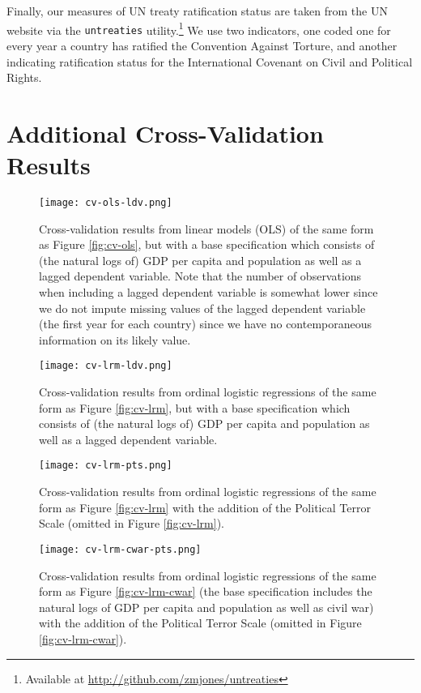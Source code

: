 \documentclass[11pt]{article}
\begin{document}
Finally, our measures of UN treaty ratification status are taken from the UN website via the {\tt untreaties} utility.\footnote{Available at \url{http://github.com/zmjones/untreaties}} We use two indicators, one coded one for every year a country has ratified the Convention Against Torture, and another indicating ratification status for the International Covenant on Civil and Political Rights. 

\section{Additional Cross-Validation Results}

\begin{figure}[!htpb]
\texttt{[image: cv-ols-ldv.png]}
\caption{Cross-validation results from linear models (OLS) of the same form as Figure \ref{fig:cv-ols}, but with a base specification which consists of (the natural logs of) GDP per capita and population as well as a lagged dependent variable. Note that the number of observations when including a lagged dependent variable is somewhat lower since we do not impute missing values of the lagged dependent variable (the first year for each country) since we have no contemporaneous information on its likely value.}
\label{fig:cv-ols-ldv}
\end{figure}

\begin{figure}[!htpb]
\texttt{[image: cv-lrm-ldv.png]}
\caption{Cross-validation results from ordinal logistic regressions of the same form as Figure \ref{fig:cv-lrm}, but with a base specification which consists of (the natural logs of) GDP per capita and population as well as a lagged dependent variable.}
\label{fig:cv-lrm-ldv}
\end{figure}

\begin{figure}[!htpb]
\texttt{[image: cv-lrm-pts.png]}
\caption{Cross-validation results from ordinal logistic regressions of the same form as Figure \ref{fig:cv-lrm} with the addition of the Political Terror Scale (omitted in Figure \ref{fig:cv-lrm}).}
\label{fig:cv-lrm-pts}
\end{figure}

\begin{figure}[!htpb]
\texttt{[image: cv-lrm-cwar-pts.png]}
\caption{Cross-validation results from ordinal logistic regressions of the same form as Figure \ref{fig:cv-lrm-cwar} (the base specification includes the natural logs of GDP per capita and population as well as civil war) with the addition of the Political Terror Scale (omitted in Figure \ref{fig:cv-lrm-cwar}).}
\label{fig:cv-lrm-cwar-pts}
\end{figure}
\end{document}

